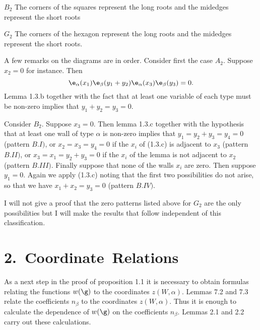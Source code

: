 \documentclass{memo-l}
\theoremstyle{definition}
\theoremstyle{remark}
\numberwithin{section}{chapter}
\numberwithin{equation}{chapter}
\begin{document}
\medskip
\medskip

\noindent $B_2$  The corners of the squares represent the long roots
and the midedges represent the short roots

\medskip
\medskip

\noindent $G_2$  The corners of the hexagon represent the long roots
and the midedges represent the short roots.
\nobreak
\medskip

\medskip
\box\boxI
\medskip

A few remarks on the diagrams are in order.  Consider first the case $A_{2}$. 
Suppose $x_{2}=0$ for instance.   Then
$$
\e_\alpha(x_{1}){\e}_{\beta}(y_{1}+y_{2})
{\e}_{\alpha}(x_{3}){\e}_{\beta}(y_{3}) = 0.
$$ 
Lemma 1.3.b together with the fact that at least one variable of each 
type must be non-zero implies that $y_{1}+y_{2}=y_{3}=0$.

Consider $B_{2}$.  Suppose $x_{3} = 0$. 
 Then lemma 1.3.c together with the hypothesis that at least one wall of 
type ${\alpha}$ is non-zero implies that $y_{1} = y_{2}+y_{3} = y_{4} = 0$ 
(pattern $B.I)$, or $x_{2} = x_{3} = y_{4} = 0$ if the $x_{i}$ of (1.3.c) is 
adjacent to $x_{3}$ (pattern $B.II)$, or $x_{3} = x_{1} = y_{2}+y_{3} = 0$ 
if the $x_{i}$ of the lemma is not adjacent to $x_{2}$ (pattern $B.III)$. 
 Finally suppose that none of the walls $x_{i}$ are zero. 
 Then suppose $y_{1} = 0$. 
 Again we apply (1.3.c) noting that the first two possibilities do not 
arise, so that we have $x_{1}+x_{2} = y_{3} = 0$ (pattern $B.IV)$.

   I will not give a proof that the zero patterns listed above for $G_{2}$ 
are the only possibilities but I will make the results that follow independent 
of this classification.

\section{2.\  Coordinate\ Relations}

   As a next step in the proof of proposition 1.1 it is necessary to obtain 
formulas relating the functions $w({\g})$ to the coordinates 
$z(W,{\alpha})$.   Lemmas 7.2 and 7.3 relate the coefficients $n_{\beta}$ 
to the coordinates $z(W,{\alpha})$. 
 Thus it is enough to calculate the dependence of $w({\g})$ on the 
coefficients $n_{\beta}$. 
  Lemmas 2.1 and 2.2 carry out these calculations.

\medpagebreak
\end{document}
